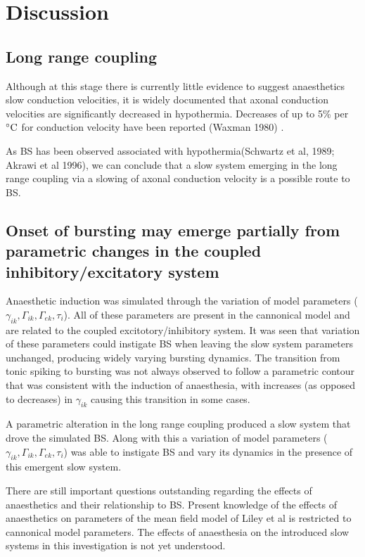 \documentclass[a4paper,12pt]{article}
\begin{document}
\section{Discussion}

\subsection{Long range coupling}
Although at this stage there is currently little evidence to suggest anaesthetics slow conduction velocities, it is
widely documented that axonal conduction velocities are significantly decreased in hypothermia. Decreases of up to 5\%
per $^{\circ}{\rm C}$ for conduction velocity have been reported (Waxman 1980) .

As BS has been observed associated with hypothermia(Schwartz et al, 1989; Akrawi et al 1996), we can conclude that  a slow system emerging in the long range coupling via a slowing of axonal conduction velocity is a possible route
to BS.

\subsection{Onset of bursting may emerge partially from parametric changes in the coupled inhibitory/excitatory system}
Anaesthetic induction was simulated through the variation of model parameters ($\gamma_{ik}, \Gamma_{ik}, \Gamma_{ek}, \tau_i$). All of these parameters are present in the cannonical model and are related to the coupled excitotory/inhibitory system. It was seen that variation of these parameters could instigate BS when leaving the slow system parameters unchanged, producing widely varying bursting dynamics. The transition from tonic spiking to bursting was not always observed to follow a parametric contour that was consistent with the induction of anaesthesia, with increases (as opposed to decreases) in $\gamma_{ik}$ causing this transition in some cases. 

A parametric alteration in the long range coupling produced a slow system that drove the simulated BS. Along with this a variation of model parameters ($\gamma_{ik}, \Gamma_{ik}, \Gamma_{ek}, \tau_i$) was able to instigate BS and vary its dynamics in the presence of this emergent slow system.

There are still important questions outstanding regarding the effects of anaesthetics and their relationship to BS. Present knowledge of the effects of anaesthetics on parameters of the mean field model of Liley et al is restricted to cannonical model parameters. The effects of anaesthesia on the introduced slow systems in this investigation is not yet understood. 
\end{document}
